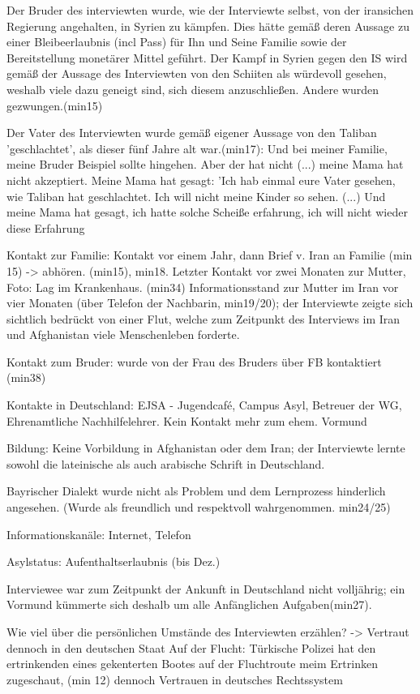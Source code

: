 Der Bruder des interviewten wurde, wie der Interviewte selbst, von der iransichen Regierung angehalten, in Syrien zu kämpfen. Dies hätte gemäß deren Aussage zu einer Bleibeerlaubnis (incl Pass) für Ihn und Seine Familie sowie der Bereitstellung monetärer Mittel geführt.
Der Kampf in Syrien gegen den IS wird gemäß der Aussage des Interviewten von den Schiiten als würdevoll gesehen, weshalb viele dazu geneigt sind, sich diesem anzuschließen. Andere wurden gezwungen.(min15)

Der Vater des Interviewten wurde gemäß eigener Aussage von den Taliban 'geschlachtet', als dieser fünf Jahre alt war.(min17): Und bei meiner Familie, meine Bruder Beispiel sollte hingehen. Aber der hat nicht (...) meine Mama hat nicht akzeptiert. Meine Mama hat gesagt: 'Ich hab einmal eure Vater gesehen, wie Taliban hat geschlachtet. Ich will nicht meine Kinder so sehen. (...) Und meine Mama hat gesagt, ich hatte solche Scheiße erfahrung, ich will nicht wieder diese Erfahrung 

Kontakt zur Familie: Kontakt vor einem Jahr, dann Brief v. Iran an Familie (min 15) -> abhören. (min15), min18. 
Letzter Kontakt vor zwei Monaten zur Mutter, Foto: Lag im Krankenhaus. (min34) 
Informationsstand zur Mutter im Iran vor vier Monaten (über Telefon der Nachbarin, min19/20); der Interviewte zeigte sich sichtlich bedrückt von einer
Flut, welche zum Zeitpunkt des Interviews im Iran und Afghanistan viele Menschenleben forderte.

Kontakt zum Bruder: wurde von der Frau des Bruders über FB kontaktiert (min38)

Kontakte in Deutschland: EJSA - Jugendcafé, Campus Asyl, Betreuer der WG, Ehrenamtliche Nachhilfelehrer. Kein Kontakt mehr zum ehem. Vormund

Bildung: Keine Vorbildung in Afghanistan oder dem Iran; der Interviewte lernte sowohl die lateinische als auch arabische Schrift in Deutschland.

Bayrischer Dialekt wurde nicht als Problem und dem Lernprozess hinderlich angesehen. (Wurde als freundlich und respektvoll wahrgenommen. min24/25)

Informationskanäle: Internet, Telefon

Asylstatus: Aufenthaltserlaubnis (bis Dez.)

Interviewee war zum Zeitpunkt der Ankunft in Deutschland nicht volljährig; ein Vormund kümmerte sich deshalb um alle Anfänglichen Aufgaben(min27).

Wie viel über die persönlichen Umstände des Interviewten erzählen? -> Vertraut dennoch in den deutschen Staat
Auf der Flucht: Türkische Polizei hat den ertrinkenden eines gekenterten Bootes auf der Fluchtroute meim Ertrinken zugeschaut, (min 12) dennoch Vertrauen in deutsches Rechtssystem

